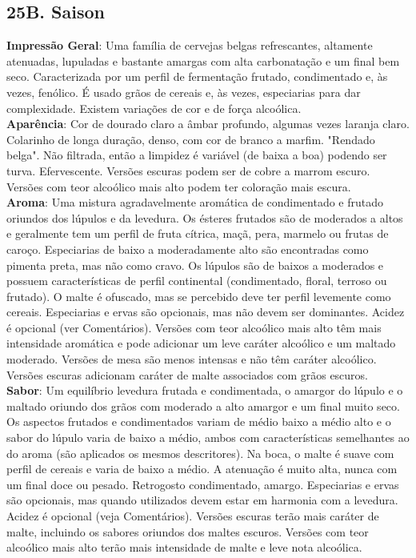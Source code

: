 \subsection*{25B. Saison}
\textbf{Impressão Geral}: Uma família de cervejas belgas refrescantes, altamente atenuadas, lupuladas e bastante amargas com alta carbonatação e um final bem seco. Caracterizada por um perfil de fermentação frutado, condimentado e, às vezes, fenólico. É usado grãos de cereais e, às vezes, especiarias para dar complexidade. Existem variações de cor e de força alcoólica. \\
\textbf{Aparência}: Cor de dourado claro a âmbar profundo, algumas vezes laranja claro. Colarinho de longa duração, denso, com cor de branco a marfim. "Rendado belga". Não filtrada, então a limpidez é variável (de baixa a boa) podendo ser turva. Efervescente. Versões escuras podem ser de cobre a marrom escuro. Versões com teor alcoólico mais alto podem ter coloração mais escura. \\
\textbf{Aroma}: Uma mistura agradavelmente aromática de condimentado e frutado oriundos dos lúpulos e da levedura. Os ésteres frutados são de moderados a altos e geralmente tem um perfil de fruta cítrica, maçã, pera, marmelo ou frutas de caroço. Especiarias de baixo a moderadamente alto são encontradas como pimenta preta, mas não como cravo. Os lúpulos são de baixos a moderados e possuem características de perfil continental (condimentado, floral, terroso ou frutado). O malte é ofuscado, mas se percebido deve ter perfil levemente como cereais. Especiarias e ervas são opcionais, mas não devem ser dominantes. Acidez é opcional (ver Comentários). Versões com teor alcoólico mais alto têm mais intensidade aromática e pode adicionar um leve caráter alcoólico e um maltado moderado. Versões de mesa são menos intensas e não têm caráter alcoólico. Versões escuras adicionam caráter de malte associados com grãos escuros. \\
\textbf{Sabor}: Um equilíbrio levedura frutada e condimentada, o amargor do lúpulo e o maltado oriundo dos grãos com moderado a alto amargor e um final muito seco. Os aspectos frutados e condimentados variam de médio baixo a médio alto e o sabor do lúpulo varia de baixo a médio, ambos com características semelhantes ao do aroma (são aplicados os mesmos descritores). Na boca, o malte é suave com perfil de cereais e varia de baixo a médio. A atenuação é muito alta, nunca com um final doce ou pesado. Retrogosto condimentado, amargo. Especiarias e ervas são opcionais, mas quando utilizados devem estar em harmonia com a levedura. Acidez é opcional (veja Comentários). Versões escuras terão mais caráter de malte, incluindo os sabores oriundos dos maltes escuros. Versões com teor alcoólico mais alto terão mais intensidade de malte e leve nota alcoólica. \\
